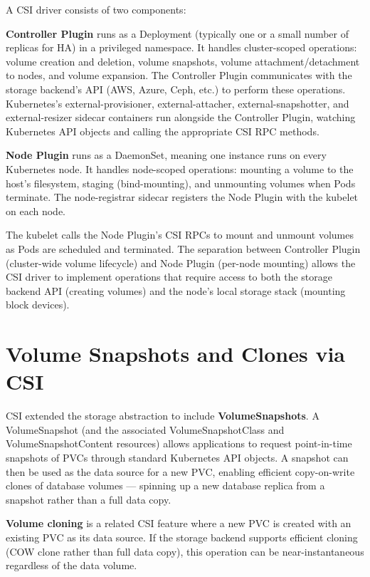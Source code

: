 A CSI driver consists of two components:

\textbf{Controller Plugin} runs as a Deployment (typically one or a small number of replicas for HA) in a privileged namespace. It handles cluster-scoped operations: volume creation and deletion, volume snapshots, volume attachment/detachment to nodes, and volume expansion. The Controller Plugin communicates with the storage backend's API (AWS, Azure, Ceph, etc.) to perform these operations. Kubernetes's external-provisioner, external-attacher, external-snapshotter, and external-resizer sidecar containers run alongside the Controller Plugin, watching Kubernetes API objects and calling the appropriate CSI RPC methods.

\textbf{Node Plugin} runs as a DaemonSet, meaning one instance runs on every Kubernetes node. It handles node-scoped operations: mounting a volume to the host's filesystem, staging (bind-mounting), and unmounting volumes when Pods terminate. The node-registrar sidecar registers the Node Plugin with the kubelet on each node.

The kubelet calls the Node Plugin's CSI RPCs to mount and unmount volumes as Pods are scheduled and terminated. The separation between Controller Plugin (cluster-wide volume lifecycle) and Node Plugin (per-node mounting) allows the CSI driver to implement operations that require access to both the storage backend API (creating volumes) and the node's local storage stack (mounting block devices).

\section{Volume Snapshots and Clones via CSI}
CSI extended the storage abstraction to include \textbf{VolumeSnapshots}. A VolumeSnapshot (and the associated VolumeSnapshotClass and VolumeSnapshotContent resources) allows applications to request point-in-time snapshots of PVCs through standard Kubernetes API objects. A snapshot can then be used as the data source for a new PVC, enabling efficient copy-on-write clones of database volumes --- spinning up a new database replica from a snapshot rather than a full data copy.

\textbf{Volume cloning} is a related CSI feature where a new PVC is created with an existing PVC as its data source. If the storage backend supports efficient cloning (COW clone rather than full data copy), this operation can be near-instantaneous regardless of the data volume.

